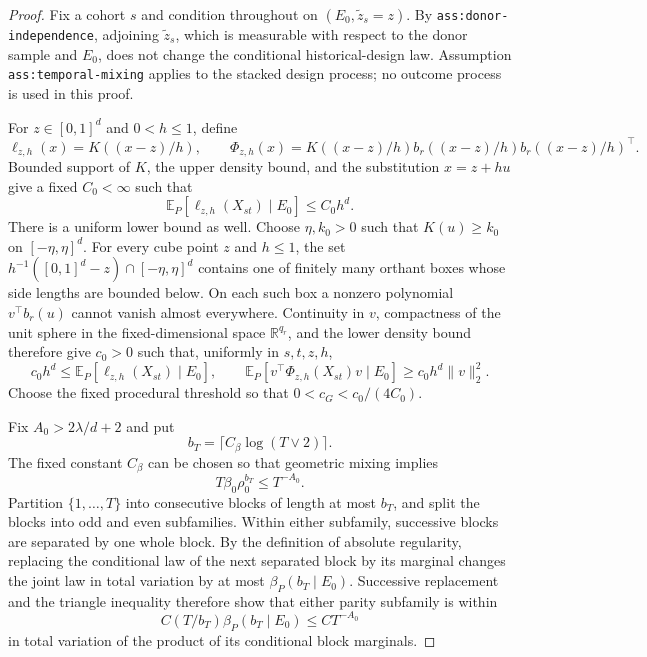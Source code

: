 \documentclass{article}
\begin{document}
\begin{proof}
Fix a cohort \(s\) and condition throughout on \((E_0,\widetilde z_s=z)\).  By \texttt{ass:donor-independence}, adjoining \(\widetilde z_s\), which is measurable with respect to the donor sample and \(E_0\), does not change the conditional historical-design law.  Assumption \texttt{ass:temporal-mixing} applies to the stacked design process; no outcome process is used in this proof.

For \(z\in[0,1]^d\) and \(0<h\leq1\), define
\[
\ell_{z,h}(x)=K((x-z)/h),
\qquad
\Phi_{z,h}(x)=K((x-z)/h)b_r((x-z)/h)b_r((x-z)/h)^\top.
\]
Bounded support of \(K\), the upper density bound, and the substitution \(x=z+hu\) give a fixed \(C_0<\infty\) such that
\[
\mathbb E_P[\ell_{z,h}(X_{st})\mid E_0]\leq C_0h^d.
\tag{56}
\]
There is a uniform lower bound as well.  Choose \(\eta,k_0>0\) such that \(K(u)\geq k_0\) on \([-\eta,\eta]^d\).  For every cube point \(z\) and \(h\leq1\), the set
\(h^{-1}([0,1]^d-z)\cap[-\eta,\eta]^d\) contains one of finitely many orthant boxes whose side lengths are bounded below.  On each such box a nonzero polynomial \(v^\top b_r(u)\) cannot vanish almost everywhere.  Continuity in \(v\), compactness of the unit sphere in the fixed-dimensional space \(\mathbb R^{q_r}\), and the lower density bound therefore give \(c_0>0\) such that, uniformly in \(s,t,z,h\),
\[
c_0h^d\leq\mathbb E_P[\ell_{z,h}(X_{st})\mid E_0],
\qquad
\mathbb E_P[v^\top\Phi_{z,h}(X_{st})v\mid E_0]
\geq c_0h^d\|v\|_2^2.
\tag{57}
\]
Choose the fixed procedural threshold so that \(0<c_G<c_0/(4C_0)\).

Fix \(A_0>2\lambda/d+2\) and put
\[
b_T=\lceil C_\beta\log(T\vee2)\rceil.
\]
The fixed constant \(C_\beta\) can be chosen so that geometric mixing implies
\[
T\beta_0\rho_0^{b_T}\leq T^{-A_0}.
\tag{58}
\]
Partition \(\{1,\ldots,T\}\) into consecutive blocks of length at most \(b_T\), and split the blocks into odd and even subfamilies.  Within either subfamily, successive blocks are separated by one whole block.  By the definition of absolute regularity, replacing the conditional law of the next separated block by its marginal changes the joint law in total variation by at most \(\beta_P(b_T\mid E_0)\).  Successive replacement and the triangle inequality therefore show that either parity subfamily is within
\[
C(T/b_T)\beta_P(b_T\mid E_0)\leq CT^{-A_0}
\tag{59}
\]
in total variation of the product of its conditional block marginals.


\end{proof}
\end{document}
